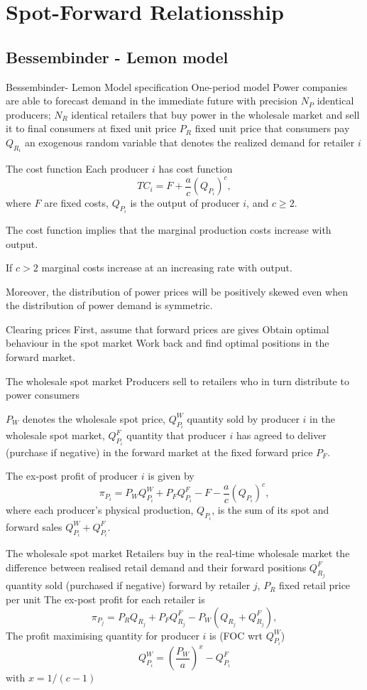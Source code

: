\section{Spot-Forward Relationsship}

\subsection{Bessembinder - Lemon model}

{Bessembinder- Lemon Model specification}
	 One-period model
	 Power companies are able to forecast demand in the immediate future with precision
	 $N_P$ identical producers; $N_R$ identical retailers that buy power in the wholesale market and sell it to final consumers at fixed unit price
	 $P_R$ fixed unit price that consumers pay
	 $Q_{R_i}$ an exogenous random variable that denotes the realized demand for retailer $i$


{The cost function}
	Each producer $i$ has cost function
		$$
		TC_i=F+\frac{a}{c}(Q_{P_i})^c,
		$$
	where $F$ are fixed costs, $Q_{P_i}$ is the output of producer $i$, and $c\geq 2$.
	
	The cost function implies that the marginal production costs increase with output.
	
	If $c>2$ marginal costs increase at an increasing rate with output.
	
	Moreover, the distribution of power prices will be positively skewed even when the distribution of power demand is symmetric.


{Clearing prices}
 First, assume that forward prices are gives
 Obtain optimal behaviour in the spot market
 Work back and find optimal positions in the forward market.


{The wholesale spot market}
	Producers sell to retailers who in turn distribute to power consumers
	
	$P_W$ denotes the wholesale spot price, $Q_{P_i}^W$ quantity sold by producer $i$ in the wholesale spot market, $Q_{P_i}^F$ quantity
	that producer $i$ has agreed to deliver (purchase if negative) in the forward market at the fixed forward price $P_F$.
	
	The ex-post profit of producer $i$ is given by
		$$ \pi_{P_i}=P_W Q_{P_i}^W + P_FQ_{P_i}^F-F-\frac{a}{c}(Q_{P_i})^c,$$
		where each producer's physical production, $Q_{P_i}$, is the sum of its spot and forward sales $Q_{P_i}^W+Q_{P_i}^F$.


{The wholesale spot market}
 Retailers buy in the real-time wholesale market the difference between realised retail demand and their forward positions
 $Q_{R_j}^F$ quantity sold (purchased if negative) forward by retailer $j$, $P_R$ fixed retail price per unit
 The ex-post profit for each retailer is
$$
\pi_{P_j}=P_R Q_{R_j} + P_FQ_{R_j}^F - P_W (Q_{R_j}+Q_{R_j}^F),$$
 The profit maximising quantity for producer $i$ is (FOC wrt $Q_{P_i}^W$)
$$Q_{P_i}^W=\left(\frac{P_W}{a}\right)^{x}-Q_{P_i}^F$$
with $x=1/(c-1)$

